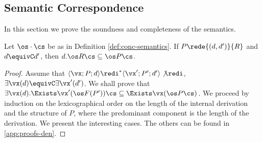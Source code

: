 \documentclass{tlp}
\begin{document}
\subsection{Semantic Correspondence}
In this section we prove the soundness and completeness of the semantics.




\begin{lemma}[Soundness]\label{lem:soundness}
Let $\os \cdot \cs$ be as in Definition \ref{def:conc-semantics}.
If $P\rede{(d, d')}{R}$ and $d \equivC d'$,  then $d.\os R \cs \subseteq  \os P\cs$.
\end{lemma}
\begin{proof}
Assume that $\langle\vx; P;d\rangle \redi^* \langle \vx'; P';d'\rangle \not\redi$,  $\exists \vx(d) \equivC \exists \vx'(d')$.
 We shall prove that $\exists \vx(d). \Exists \vx' (\os F(P')) \cs \subseteq \Exists \vx(\os P\cs)$. 
	We proceed by induction on the lexicographical order on the length of the internal derivation   and the structure of  $P$, where the predominant component is the length of the derivation. We present the interesting cases. The others can be found in \ref{app:proofs-den}. 


\end{proof}
\end{document}
